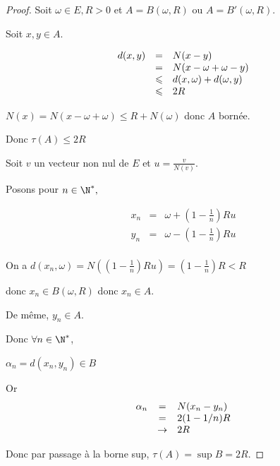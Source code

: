 \begin{proof}
    
    Soit $\omega \in E, R>0$ et $A = B(\omega, R)$ ou $A = B'(\omega, R)$. 

    Soit $x, y \in A$. 

    \[
    \begin{array}{rcl}
        d(x, y) & = & N(x - y) \\
        \space & = & N(x - \omega + \omega - y) \\
        \space & \leqslant & d(x, \omega) + d(\omega, y) \\
        \space & \leqslant & 2R \\
    \end{array}
    \]

    $N(x) = N(x - \omega + \omega) \leqslant R + N(\omega)$ donc $A$ bornée. 

    Donc $\tau(A) \leqslant 2R$

    Soit $v$ un vecteur non nul de $E$ et $u = \frac v {N(v)}$. 

    Posons pour $n \in \N^*,$

    \[
    \begin{array}{rcl}
        x_n & = & \omega + (1 - \frac 1 n) R u \\
        y_n & = & \omega - ( 1 - \frac 1 n) R u \\
    \end{array}
    \]

    On a $d(x_n, \omega) = N((1 - \frac 1 n)Ru) = ( 1 - \frac 1 n )R < R$

    donc $x_n \in B(\omega, R)$ donc $x_n \in A$. 

    De même, $y_n \in A$.

    Donc $\forall n \in \N^*$, 

    $\alpha_n = d(x_n, y_n) \in B$

    Or 
    \[
    \begin{array}{rcl}
        \alpha_n & = & N(x_n - y_n) \\
        \space & = & 2 (1 - 1 / n) R \\
        \space & \to & 2 R \\
    \end{array}
    \]

    Donc par passage à la borne sup, $\tau(A) = \sup B = 2R$.    
\end{proof}

